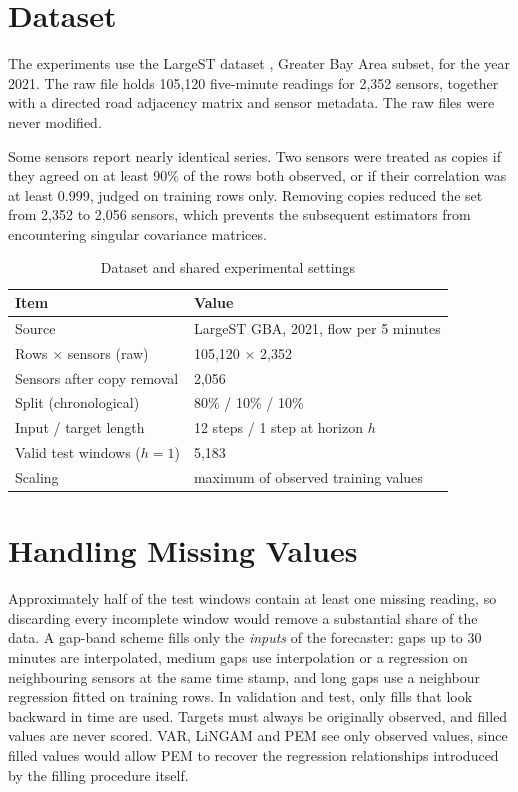 \documentclass[MTech]{ugthesis}
\begin{document}
\section{Dataset}
The experiments use the LargeST dataset \citep{liu2023largest}, Greater Bay Area subset, for the year 2021. The raw file holds 105,120 five-minute readings for 2,352 sensors, together with a directed road adjacency matrix and sensor metadata. The raw files were never modified.

Some sensors report nearly identical series. Two sensors were treated as copies if they agreed on at least 90\% of the rows both observed, or if their correlation was at least 0.999, judged on training rows only. Removing copies reduced the set from 2,352 to 2,056 sensors, which prevents the subsequent estimators from encountering singular covariance matrices.

\begin{table}[h]
\centering
\caption{Dataset and shared experimental settings}
\begin{tabular}{ll}
\hline
Item & Value \\
\hline
Source & LargeST GBA, 2021, flow per 5 minutes \\
Rows $\times$ sensors (raw) & 105,120 $\times$ 2,352 \\
Sensors after copy removal & 2,056 \\
Split (chronological) & 80\% / 10\% / 10\% \\
Input / target length & 12 steps / 1 step at horizon $h$ \\
Valid test windows ($h=1$) & 5,183 \\
Scaling & maximum of observed training values \\
\hline
\end{tabular}
\label{tab:data}
\end{table}

\section{Handling Missing Values}
Approximately half of the test windows contain at least one missing reading, so discarding every incomplete window would remove a substantial share of the data. A gap-band scheme fills only the \emph{inputs} of the forecaster: gaps up to 30 minutes are interpolated, medium gaps use interpolation or a regression on neighbouring sensors at the same time stamp, and long gaps use a neighbour regression fitted on training rows. In validation and test, only fills that look backward in time are used. Targets must always be originally observed, and filled values are never scored. VAR, LiNGAM and PEM see only observed values, since filled values would allow PEM to recover the regression relationships introduced by the filling procedure itself.
\end{document}
